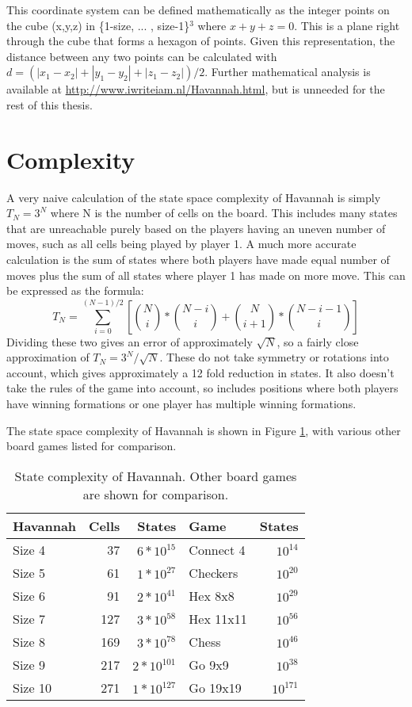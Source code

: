 This coordinate system can be defined mathematically as the integer points on the cube (x,y,z) in \{1-size, ... , size-1\}$^3$ where $x + y + z = 0$. This is a plane right through the cube that forms a hexagon of points. Given this representation, the distance between any two points can be calculated with $d = (|x_1-x_2| + |y_1-y_2| + |z_1-z_2|)/2$. Further mathematical analysis is available at \url{http://www.iwriteiam.nl/Havannah.html}, but is unneeded for the rest of this thesis.



\section{Complexity}

A very naive calculation of the state space complexity of Havannah is simply $T_N = 3^N$ where N is the number of cells on the board. This includes many states that are unreachable purely based on the players having an uneven number of moves, such as all cells being played by player 1. A much more accurate calculation is the sum of states where both players have made equal number of moves plus the sum of all states where player 1 has  made on more move. This can be expressed as the formula:
$$T_N = \sum_{i = 0}^{(N-1)/2} [ {N \choose i}*{N-i \choose i} + {N \choose i + 1}*{N - i - 1 \choose i}]$$
Dividing these two gives an error of approximately $\sqrt{N}$, so a fairly close approximation of $T_N = 3^N/\sqrt{N}$. These do not take symmetry or rotations into account, which gives approximately a 12 fold reduction in states. It also doesn't take the rules of the game into account, so includes positions where both players have winning formations or one player has multiple winning formations.

The state space complexity of Havannah is shown in Figure \ref{table:complexity}, with various other board games listed for comparison.

\begin{table}
  \centering
\begin{tabular}{lrr|lr}
Havannah & Cells & States       & Game      & States \\ \hline
Size 4   &    37 & $6*10^{15}$  & Connect 4 & $10^{14}$ \\
Size 5   &    61 & $1*10^{27}$  & Checkers  & $10^{20}$ \\
Size 6   &    91 & $2*10^{41}$  & Hex 8x8   & $10^{29}$ \\
Size 7   &   127 & $3*10^{58}$  & Hex 11x11 & $10^{56}$ \\
Size 8   &   169 & $3*10^{78}$  & Chess     & $10^{46}$ \\
Size 9   &   217 & $2*10^{101}$ & Go 9x9    & $10^{38}$ \\
Size 10  &   271 & $1*10^{127}$ & Go 19x19  & $10^{171}$\\

\end{tabular}
	\caption{State complexity of Havannah. Other board games are shown for comparison.}
	\label{table:complexity}
\end{table}

